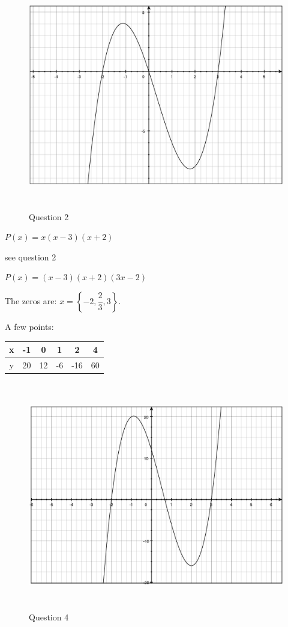 \documentclass[fleqn,addpoints]{exam}
\begin{document}
\begin{questions}
\begin{solution}
\begin{figure}[H]
  \centering
  \includegraphics[width=14cm,height=10cm]{question_2.eps}
  \caption*{Question 2}
\end{figure}

\end{solution}

\question $P(x) = x(x-3)(x+2)$
\begin{solution}
see question 2
\end{solution}

\ifprintanswers
\pagebreak
\else
\fi

\question $P(x) = (x-3)(x+2)(3x-2)$
\begin{solution}

The zeros are: $x = \left\{-2, \dfrac{2}{3}, 3 \right\}$.

A few points:
\begin{tabular}{|c|c|c|c|c|c|}
\hline
  x & -1 &  0 &  1 & 2  & 4 \\
\hline
  y & 20 & 12 & -6 & -16 & 60 \\
\hline
\end{tabular}

\begin{figure}[H]
  \centering
  \includegraphics[width=14cm,height=10cm]{question_4.eps}
  \caption*{Question 4}
\end{figure}


\end{solution}
\end{questions}
\end{document}
